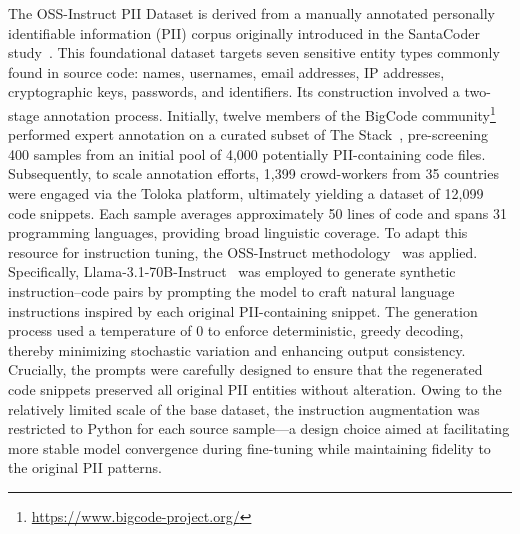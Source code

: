 \documentclass{article}
\theoremstyle{plain}
\theoremstyle{definition}
\theoremstyle{remark}
\begin{document}
{ The OSS-Instruct PII Dataset is derived from a manually annotated personally identifiable information (PII) corpus originally introduced in the SantaCoder study~\cite{santacoder}. This foundational dataset targets seven sensitive entity types commonly found in source code: names, usernames, email addresses, IP addresses, cryptographic keys, passwords, and identifiers. Its construction involved a two-stage annotation process. Initially, twelve members of the BigCode community\footnote{\url{https://www.bigcode-project.org/}} performed expert annotation on a curated subset of The Stack~\cite{kocetkov2022stack3tbpermissively}, pre-screening 400 samples from an initial pool of 4,000 potentially PII-containing code files. Subsequently, to scale annotation efforts, 1,399 crowd-workers from 35 countries were engaged via the Toloka platform, ultimately yielding a dataset of 12,099 code snippets. Each sample averages approximately 50 lines of code and spans 31 programming languages, providing broad linguistic coverage.
To adapt this resource for instruction tuning, the OSS-Instruct methodology~\cite{magicoder} was applied. Specifically, Llama-3.1-70B-Instruct~\cite{patterson2022carbonfootprintmachinelearning} was employed to generate synthetic instruction–code pairs by prompting the model to craft natural language instructions inspired by each original PII-containing snippet. The generation process used a temperature of 0 to enforce deterministic, greedy decoding, thereby minimizing stochastic variation and enhancing output consistency. Crucially, the prompts were carefully designed to ensure that the regenerated code snippets preserved all original PII entities without alteration. Owing to the relatively limited scale of the base dataset, the instruction augmentation was restricted to Python for each source sample—a design choice aimed at facilitating more stable model convergence during fine-tuning while maintaining fidelity to the original PII patterns.






















}
\end{document}
